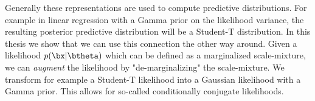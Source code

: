 Generally these representations are used to compute predictive distributions.
For example in linear regression with a Gamma prior on the likelihood variance, the resulting posterior predictive distribution will be a Student-T distribution.
In this thesis we show that we can use this connection the other way around.
Given a likelihood $p(\bx|\btheta)$ which can be defined as a marginalized scale-mixture,
we can \textit{augment} the likelihood by "de-marginalizing" the scale-mixture.
We transform for example a Student-T likelihood into a Gaussian likelihood with a Gamma prior.
This allows for so-called conditionally conjugate likelihoods.



